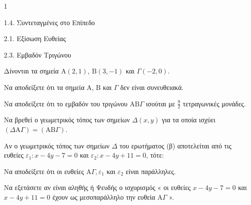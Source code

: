 \begin{ylh}{1}
    \item 1.4. Συντεταγμένες στο Επίπεδο
    \item 2.1. Εξίσωση Ευθείας
    \item 2.3. Εμβαδόν Τριγώνου
\end{ylh}
Δίνονται τα σημεία $\mathrm{A}(2,1)$, $\mathrm{B}(3,-1)$ και $\Gamma(-2,0)$.
\begin{alist}
    \item[α)]
    \begin{rlist}
        \item Να αποδείξετε ότι τα σημεία $\mathrm{A}$, $\mathrm{B}$ και $\Gamma$ δεν είναι συνευθειακά. 
        \item Να αποδείξετε ότι το εμβαδόν του τριγώνου $\mathrm{AB} \Gamma$ ισούται με $\frac{9}{2}$ τετραγωνικές μονάδες. 
    \end{rlist}
    \item[β)] Να βρεθεί ο γεωμετρικός τόπος των σημείων $\Delta(x,y)$ για τα οποία ισχύει $(\Delta \mathrm{A} \Gamma)=(\mathrm{AB} \Gamma)$. 
    \item[γ)] Αν ο γεωμετρικός τόπος των σημείων $\Delta$ του ερωτήματος (β) αποτελείται από τις ευθείες $\varepsilon_{1}: x-4 y-7=0$ και $\varepsilon_{2}: x-4 y+11=0$, τότε:
    \begin{rlist}
        \item Να αποδείξετε ότι οι ευθείες $\mathrm{A} \Gamma, \varepsilon_{1}$ και $\varepsilon_{2}$ είναι παράλληλες. 
        \item Να εξετάσετε αν είναι αληθής ή Ψευδής ο ισχυρισμός « οι ευθείες $x-4 y-7=0$ και $x-4 y+11=0$ έχουν ως μεσοπαράλληλο την ευθεία $\mathrm{A} \Gamma$ ». 
    \end{rlist}
\end{alist}